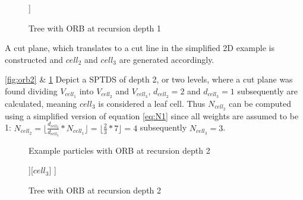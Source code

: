 \documentclass[]{article}
\begin{document}
\begin{figure}[H]
	\centering
	\begin{forest}
		[$cell_1$
		[$cell_2$][$cell_3$]  
		]
	\end{forest}    
	\caption{Tree with ORB at recursion depth 1}
	\label{fig:orb22}
\end{figure}
A cut plane, which translates to a cut line in the simplified 2D example is constructed and $cell_2$ and $cell_3$ are generated accordingly.

\ref{fig:orb2} \&  \ref{fig:orb22} Depict a SPTDS of depth 2, or two levels, where a cut plane was found dividing $V_{cell_1}$ into $V_{cell_2}$ and $V_{cell_3}$, $d_{cell_2} = 2$ and $d_{cell_3} = 1$ subsequently are calculated, meaning $cell_3$ is considered a leaf cell. Thus $N_{cell_2}$ can be computed using a simplified version of equation \ref{eq:N1} since all weights are assumed to be 1: $N_{cell_2} = \lfloor \frac{d_{cell_2}}{d_{cell_3}} * N_{cell_1} \rfloor = \lfloor \frac{2}{3}  * 7 \rfloor = 4$ subsequently $N_{cell_3} = 3$. 

\begin{figure}[H]
	\begin{center}
	\end{center}
	\caption{Example particles with ORB at recursion depth 2}
	\label{fig:orb3}
\end{figure}

\begin{figure}[H]
	\centering
	\begin{forest}
		[$cell_1$
		[$cell_2$ [$cell_4$] [$cell_5$]][$cell_3$]  
		]
	\end{forest}
	\caption{Tree with ORB at recursion depth 2}
\end{figure}
\end{document}
